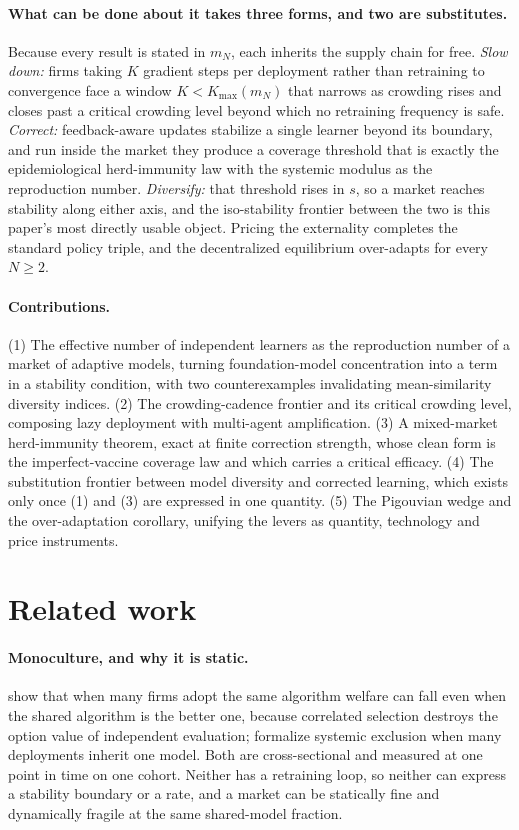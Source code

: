 \documentclass{article}
\theoremstyle{plain}
\theoremstyle{definition}
\newcommand{\mN}{m_N}
\begin{document}
\paragraph{What can be done about it takes three forms, and two are substitutes.}
Because every result is stated in $\mN$, each inherits the supply chain for free. \emph{Slow down:} firms taking $K$ gradient steps per deployment rather than retraining to convergence face a window $K < K_{\max}(\mN)$ that narrows as crowding rises and closes past a critical crowding level beyond which no retraining frequency is safe. \emph{Correct:} feedback-aware updates \citep{izzo2021} stabilize a single learner beyond its boundary, and run inside the market they produce a coverage threshold that is exactly the epidemiological herd-immunity law with the systemic modulus as the reproduction number. \emph{Diversify:} that threshold rises in $s$, so a market reaches stability along either axis, and the iso-stability frontier between the two is this paper's most directly usable object. Pricing the externality completes the standard policy triple, and the decentralized equilibrium over-adapts for every $N \geq 2$.

\paragraph{Contributions.}
(1) The effective number of independent learners as the reproduction number of a market of adaptive models, turning foundation-model concentration into a term in a stability condition, with two counterexamples invalidating mean-similarity diversity indices. (2) The crowding-cadence frontier and its critical crowding level, composing lazy deployment with multi-agent amplification. (3) A mixed-market herd-immunity theorem, exact at finite correction strength, whose clean form is the imperfect-vaccine coverage law and which carries a critical efficacy. (4) The substitution frontier between model diversity and corrected learning, which exists only once (1) and (3) are expressed in one quantity. (5) The Pigouvian wedge and the over-adaptation corollary, unifying the levers as quantity, technology and price instruments.

\section{Related work}

\paragraph{Monoculture, and why it is static.}
\citet{kleinberg2021} show that when many firms adopt the same algorithm welfare can fall even when the shared algorithm is the better one, because correlated selection destroys the option value of independent evaluation; \citet{bommasani2022} formalize systemic exclusion when many deployments inherit one model. Both are cross-sectional and measured at one point in time on one cohort. Neither has a retraining loop, so neither can express a stability boundary or a rate, and a market can be statically fine and dynamically fragile at the same shared-model fraction.
\end{document}
